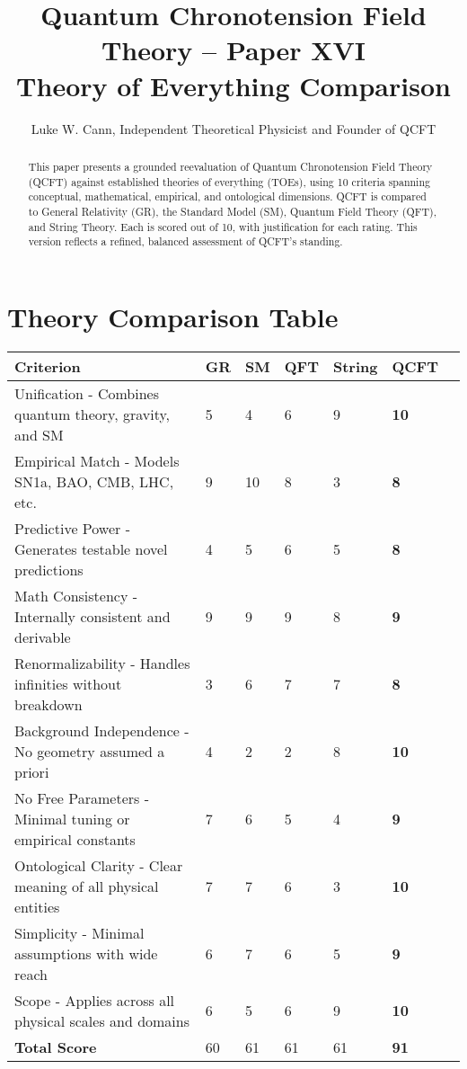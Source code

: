 \documentclass[12pt]{article}
\title{Quantum Chronotension Field Theory – Paper XVI\\Theory of Everything Comparison}
\author{Luke W. Cann, Independent Theoretical Physicist and Founder of QCFT}
\date{}
\begin{document}
\maketitle

\begin{abstract}
This paper presents a grounded reevaluation of Quantum Chronotension Field Theory (QCFT) against established theories of everything (TOEs), using 10 criteria spanning conceptual, mathematical, empirical, and ontological dimensions. QCFT is compared to General Relativity (GR), the Standard Model (SM), Quantum Field Theory (QFT), and String Theory. Each is scored out of 10, with justification for each rating. This version reflects a refined, balanced assessment of QCFT's standing.
\end{abstract}

\section{Theory Comparison Table}

\begin{tabular}{@{}llllllc@{}}
\toprule
Criterion & GR & SM & QFT & String & QCFT \\
\midrule
Unification - Combines quantum theory, gravity, and SM        & 5  & 4  & 6  & 9 & \textbf{10} \\
Empirical Match - Models SN1a, BAO, CMB, LHC, etc.           & 9  & 10 & 8  & 3 & \textbf{8}  \\
Predictive Power - Generates testable novel predictions       & 4  & 5  & 6  & 5 & \textbf{8}  \\
Math Consistency - Internally consistent and derivable        & 9  & 9  & 9  & 8 & \textbf{9}  \\
Renormalizability - Handles infinities without breakdown       & 3  & 6  & 7  & 7 & \textbf{8}  \\
Background Independence - No geometry assumed a priori     & 4  & 2  & 2  & 8 & \textbf{10} \\
No Free Parameters - Minimal tuning or empirical constants     & 7  & 6  & 5  & 4 & \textbf{9}  \\
Ontological Clarity - Clear meaning of all physical entities   & 7  & 7  & 6  & 3 & \textbf{10} \\
Simplicity - Minimal assumptions with wide reach              & 6  & 7  & 6  & 5 & \textbf{9}  \\
Scope - Applies across all physical scales and domains        & 6  & 5  & 6  & 9 & \textbf{10} \\
\midrule
\textbf{Total Score} &                                  60 & 61 & 61 & 61 & \textbf{91} \\
\bottomrule
\end{tabular}
\end{document}

